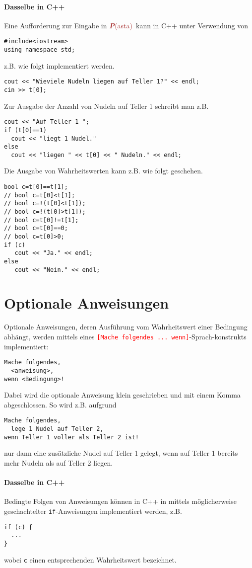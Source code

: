 \documentclass[11pt]{book}
\newcommand{\Pasta}{\textcolor{brown}{{\bf \em P}{\scriptsize{(asta)}}}}
\begin{document}
\paragraph{Dasselbe in C++}
Eine Aufforderung zur Eingabe in \Pasta\ kann in
C++ unter Verwendung von
\begin{lstlisting}
#include<iostream>
using namespace std;
\end{lstlisting}
z.B. wie folgt implementiert werden.
\begin{lstlisting}
cout << "Wieviele Nudeln liegen auf Teller 1?" << endl;
cin >> t[0];
\end{lstlisting}
Zur Ausgabe der Anzahl von Nudeln auf Teller 1 schreibt
man z.B.
\begin{lstlisting}
cout << "Auf Teller 1 ";
if (t[0]==1)
  cout << "liegt 1 Nudel." 
else
  cout << "liegen " << t[0] << " Nudeln." << endl;
\end{lstlisting}
Die Ausgabe von Wahrheitswerten kann z.B. wie folgt geschehen.
\begin{lstlisting}
bool c=t[0]==t[1];
// bool c=t[0]<t[1];
// bool c=!(t[0]<t[1]);
// bool c=!(t[0]>t[1]);
// bool c=t[0]!=t[1];
// bool c=t[0]==0;
// bool c=t[0]>0;
if (c)
   cout << "Ja." << endl;
else
   cout << "Nein." << endl;
\end{lstlisting}

\section{Optionale Anweisungen}

Optionale Anweisungen, deren Ausf\"uhrung vom Wahrheitswert einer Bedingung
abh\"angt, werden mittels eines \textcolor{red}{\lstinline{[Mache folgendes ... wenn]}}-Sprach-konstrukts implementiert: 
\color{red}
\begin{lstlisting}
Mache folgendes,
  <anweisung>,
wenn <Bedingung>!
\end{lstlisting}
\color{black}
Dabei wird die optionale Anweisung klein geschrieben und mit einem Komma
abgeschlossen.
So wird z.B. aufgrund
\color{blue}
\begin{lstlisting}
Mache folgendes,
  lege 1 Nudel auf Teller 2,
wenn Teller 1 voller als Teller 2 ist!
\end{lstlisting}
\color{black}
nur dann eine zus\"atzliche Nudel auf Teller 1 gelegt, wenn auf Teller 1 bereits
mehr Nudeln als auf Teller 2 liegen.

\paragraph{Dasselbe in C++}
Bedingte Folgen von Anweisungen k\"onnen in C++ in mittels
m\"oglicherweise geschachtelter \lstinline{if}-Anweisungen 
implementiert werden, z.B.
\begin{lstlisting}
if (c) {
  ...
}
\end{lstlisting}
wobei \lstinline{c} einen entsprechenden Wahrheitswert
bezeichnet.
\end{document}
